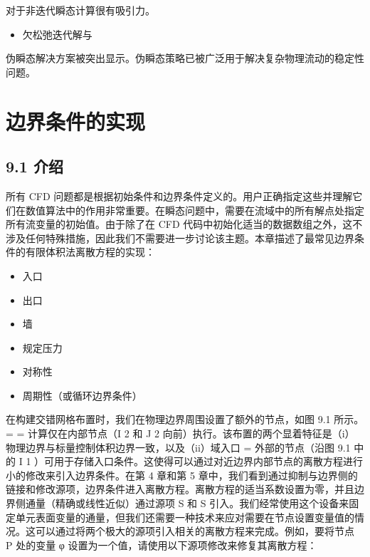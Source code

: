 \documentclass[11pt,a4paper,openany,fontset=none]{ctexbook}
\begin{document}
对于非迭代瞬态计算很有吸引力。

\begin{itemize}

\item 欠松弛迭代解与

\end{itemize}

伪瞬态解决方案被突出显示。伪瞬态策略已被广泛用于解决复杂物理流动的稳定性问题。

\chapter{边界条件的实现}

\section*{9.1 介绍}

所有 CFD 问题都是根据初始条件和边界条件定义的。用户正确指定这些并理解它们在数值算法中的作用非常重要。在瞬态问题中，需要在流域中的所有解点处指定所有流变量的初始值。由于除了在 CFD 代码中初始化适当的数据数组之外，这不涉及任何特殊措施，因此我们不需要进一步讨论该主题。本章描述了最常见边界条件的有限体积法离散方程的实现：

\begin{itemize}

\item 入口

\item 出口

\item 墙

\item 规定压力

\item 对称性

\item 周期性（或循环边界条件）

\end{itemize}

在构建交错网格布置时，我们在物理边界周围设置了额外的节点，如图 9.1 所示。 = = 计算仅在内部节点（I 2 和 J 2 向前）执行。该布置的两个显着特征是（i）物理边界与标量控制体积边界一致，以及（ii）域入口 = 外部的节点（沿图 9.1 中的 I 1 ）可用于存储入口条件。这使得可以通过对近边界内部节点的离散方程进行小的修改来引入边界条件。在第 4 章和第 5 章中，我们看到通过抑制与边界侧的链接和修改源项，边界条件进入离散方程。离散方程的适当系数设置为零，并且边界侧通量（精确或线性近似）通过源项 S 和 S 引入。我们经常使用这个设备来固定单元表面变量的通量，但我们还需要一种技术来应对需要在节点设置变量值的情况。这可以通过将两个极大的源项引入相关的离散方程来完成。例如，要将节点 P 处的变量 φ 设置为一个值，请使用以下源项修改来修复其离散方程：
\end{document}
